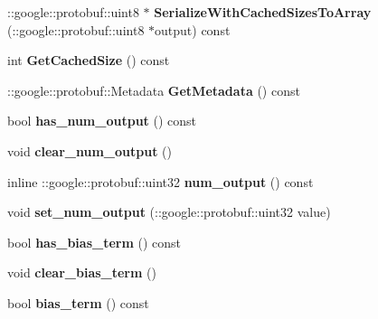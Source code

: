 \begin{DoxyCompactItemize}
\+::google\+::protobuf\+::uint8 $\ast$ {\bfseries Serialize\+With\+Cached\+Sizes\+To\+Array} (\+::google\+::protobuf\+::uint8 $\ast$output) const
\item 
\mbox{\label{classcaffe_1_1_convolution_parameter_a4d9532645395d201f77eeb6663a3ff5d}} 
int {\bfseries Get\+Cached\+Size} () const
\item 
\mbox{\label{classcaffe_1_1_convolution_parameter_a08db12b7ce9c6b42f1ef299e5761f514}} 
\+::google\+::protobuf\+::\+Metadata {\bfseries Get\+Metadata} () const
\item 
\mbox{\label{classcaffe_1_1_convolution_parameter_a578e93d9d6bd6fb5fed521bbc12b4ef4}} 
bool {\bfseries has\+\_\+num\+\_\+output} () const
\item 
\mbox{\label{classcaffe_1_1_convolution_parameter_a1efd3e9fcd3ab5a78ac809dd2696af06}} 
void {\bfseries clear\+\_\+num\+\_\+output} ()
\item 
\mbox{\label{classcaffe_1_1_convolution_parameter_a178d2f6c08e5a102660111234a0ca77c}} 
inline \+::google\+::protobuf\+::uint32 {\bfseries num\+\_\+output} () const
\item 
\mbox{\label{classcaffe_1_1_convolution_parameter_a21e1ab8030050ccf77d5e1ef1f334d63}} 
void {\bfseries set\+\_\+num\+\_\+output} (\+::google\+::protobuf\+::uint32 value)
\item 
\mbox{\label{classcaffe_1_1_convolution_parameter_a59bd05e3cf9de60b728478210966eb2a}} 
bool {\bfseries has\+\_\+bias\+\_\+term} () const
\item 
\mbox{\label{classcaffe_1_1_convolution_parameter_a137d53c77b940335d368cfd7405b69b0}} 
void {\bfseries clear\+\_\+bias\+\_\+term} ()
\item 
\mbox{\label{classcaffe_1_1_convolution_parameter_a351547b43ed3367b94c097729db70752}} 
bool {\bfseries bias\+\_\+term} () const

\end{DoxyCompactItemize}
